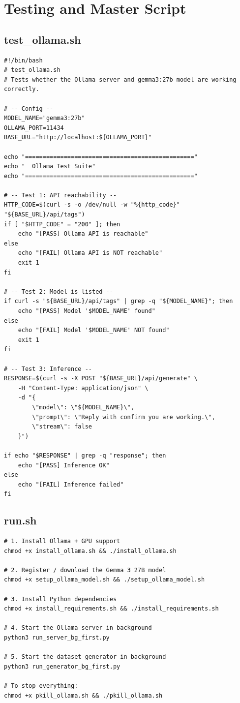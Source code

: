 \documentclass[11pt]{article}
\begin{document}
\newpage
\section{Testing and Master Script}

\subsection{test\_ollama.sh}
\begin{lstlisting}[style=bashstyle, caption={test\_ollama.sh}]
#!/bin/bash
# test_ollama.sh
# Tests whether the Ollama server and gemma3:27b model are working correctly.

# -- Config --
MODEL_NAME="gemma3:27b"
OLLAMA_PORT=11434
BASE_URL="http://localhost:${OLLAMA_PORT}"

echo "================================================"
echo "  Ollama Test Suite"
echo "================================================"

# -- Test 1: API reachability --
HTTP_CODE=$(curl -s -o /dev/null -w "%{http_code}" "${BASE_URL}/api/tags")
if [ "$HTTP_CODE" = "200" ]; then
    echo "[PASS] Ollama API is reachable"
else
    echo "[FAIL] Ollama API is NOT reachable"
    exit 1
fi

# -- Test 2: Model is listed --
if curl -s "${BASE_URL}/api/tags" | grep -q "${MODEL_NAME}"; then
    echo "[PASS] Model '$MODEL_NAME' found"
else
    echo "[FAIL] Model '$MODEL_NAME' NOT found"
    exit 1
fi

# -- Test 3: Inference --
RESPONSE=$(curl -s -X POST "${BASE_URL}/api/generate" \
    -H "Content-Type: application/json" \
    -d "{
        \"model\": \"${MODEL_NAME}\",
        \"prompt\": \"Reply with confirm you are working.\",
        \"stream\": false
    }")

if echo "$RESPONSE" | grep -q "response"; then
    echo "[PASS] Inference OK"
else
    echo "[FAIL] Inference failed"
fi
\end{lstlisting}

\newpage
\subsection{run.sh}
\begin{lstlisting}[style=bashstyle, caption={run.sh}]
# 1. Install Ollama + GPU support
chmod +x install_ollama.sh && ./install_ollama.sh

# 2. Register / download the Gemma 3 27B model
chmod +x setup_ollama_model.sh && ./setup_ollama_model.sh

# 3. Install Python dependencies
chmod +x install_requirements.sh && ./install_requirements.sh

# 4. Start the Ollama server in background
python3 run_server_bg_first.py

# 5. Start the dataset generator in background
python3 run_generator_bg_first.py

# To stop everything:
chmod +x pkill_ollama.sh && ./pkill_ollama.sh
\end{lstlisting}
\end{document}
